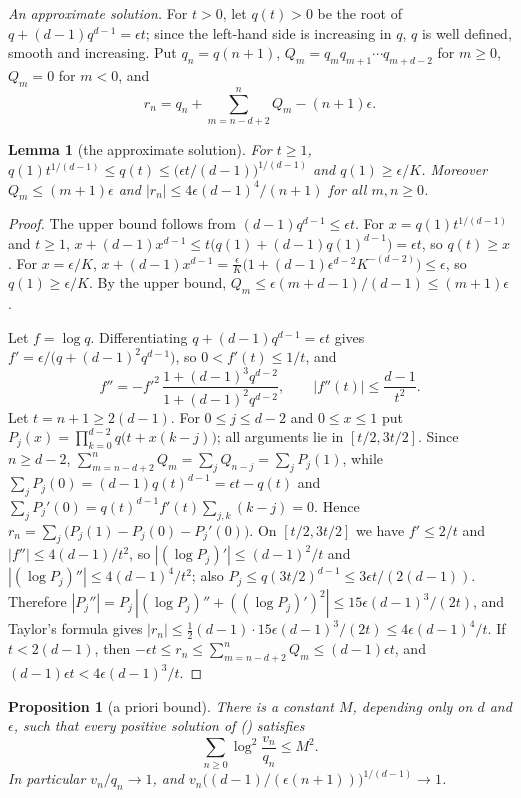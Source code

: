 \documentclass[twoside,10pt]{article}
\numberwithin{equation}{section}
\theoremstyle{slbody}
\newtheorem{proposition}[theorem]{Proposition}
\newtheorem{lemma}[theorem]{Lemma}
\theoremstyle{remark}
\renewcommand{\eqref}[1]{%
  \textup{{\normalfont(\oldstylenums{\ref{#1}}}\normalfont)}}
\begin{document}
\emph{An approximate solution.}  For \(t>0\), let \(q(t)>0\) be the
root of \(q+(d-1)q^{d-1}=\epsilon t\); since the left-hand side is
increasing in \(q\), \(q\) is well defined, smooth and increasing.  Put
\(q_n=q(n+1)\), \(Q_m=q_mq_{m+1}\cdots q_{m+d-2}\) for \(m\geq0\),
\(Q_m=0\) for \(m<0\), and
\[
r_n=q_n+\sum_{m=n-d+2}^{n}Q_m-(n+1)\epsilon .
\]

\begin{lemma}[the approximate solution]\label{lem:reference}
For \(t\geq1\),
\(q(1)t^{1/(d-1)}\leq q(t)\leq\bigl(\epsilon t/(d-1)\bigr)^{1/(d-1)}\) and
\(q(1)\geq\epsilon/K\).  Moreover \(Q_m\leq(m+1)\epsilon\) and
\(|r_n|\leq4\epsilon(d-1)^4/(n+1)\) for all \(m,n\geq0\).
\end{lemma}

\begin{proof}
The upper bound follows from \((d-1)q^{d-1}\leq\epsilon t\).  For
\(x=q(1)t^{1/(d-1)}\) and \(t\geq1\),
\(x+(d-1)x^{d-1}\leq t\bigl(q(1)+(d-1)q(1)^{d-1}\bigr)=\epsilon t\), so
\(q(t)\geq x\).  For \(x=\epsilon/K\),
\(x+(d-1)x^{d-1}=\frac\epsilon K\bigl(1+(d-1)\epsilon^{d-2}K^{-(d-2)}\bigr)
\leq\epsilon\), so \(q(1)\geq\epsilon/K\).  By the upper bound,
\(Q_m\leq\epsilon(m+d-1)/(d-1)\leq(m+1)\epsilon\).

Let \(f=\log q\).  Differentiating \(q+(d-1)q^{d-1}=\epsilon t\) gives
\(f'=\epsilon/\bigl(q+(d-1)^2q^{d-1}\bigr)\), so \(0<f'(t)\leq1/t\), and
\[
f''=-f'^2\,\frac{1+(d-1)^3q^{d-2}}{1+(d-1)^2q^{d-2}},
\qquad
|f''(t)|\leq\frac{d-1}{t^2}.
\]
Let \(t=n+1\geq2(d-1)\).  For \(0\leq j\leq d-2\) and \(0\leq x\leq1\)
put \(P_j(x)=\prod_{k=0}^{d-2}q\bigl(t+x(k-j)\bigr)\); all arguments lie
in \([t/2,3t/2]\).  Since \(n\geq d-2\),
\(\sum_{m=n-d+2}^{n}Q_m=\sum_jQ_{n-j}=\sum_jP_j(1)\), while
\(\sum_jP_j(0)=(d-1)q(t)^{d-1}=\epsilon t-q(t)\) and
\(\sum_jP_j'(0)=q(t)^{d-1}f'(t)\sum_{j,k}(k-j)=0\).  Hence
\(r_n=\sum_j\bigl(P_j(1)-P_j(0)-P_j'(0)\bigr)\).  On \([t/2,3t/2]\) we have
\(f'\leq2/t\) and \(|f''|\leq4(d-1)/t^2\), so
\(|(\log P_j)'|\leq(d-1)^2/t\) and \(|(\log P_j)''|\leq4(d-1)^4/t^2\);
also \(P_j\leq q(3t/2)^{d-1}\leq3\epsilon t/(2(d-1))\).  Therefore
\(|P_j''|=P_j\,|(\log P_j)''+((\log P_j)')^2|\leq15\epsilon(d-1)^3/(2t)\),
and Taylor's formula gives
\(|r_n|\leq\frac12(d-1)\cdot15\epsilon(d-1)^3/(2t)\leq4\epsilon(d-1)^4/t\).
If \(t<2(d-1)\), then
\(-\epsilon t\leq r_n\leq\sum_{m=n-d+2}^{n}Q_m\leq(d-1)\epsilon t\),
and \((d-1)\epsilon t<4\epsilon(d-1)^3/t\).
\end{proof}

\begin{proposition}[a priori bound]\label{prop:apriori}
There is a constant \(M\), depending only on \(d\) and \(\epsilon\), such
that every positive solution of \eqref{eq:integrated} satisfies
\[
\sum_{n\geq0}\log^2\frac{v_n}{q_n}\leq M^2 .
\]
In particular \(v_n/q_n\to1\), and
\(v_n\bigl((d-1)/(\epsilon(n+1))\bigr)^{1/(d-1)}\to1\).
\end{proposition}
\end{document}
